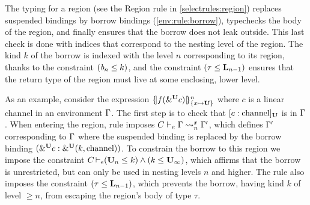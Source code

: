 The typing for a region (see the {\sc Region} rule in \cref{selectrules:region})
replaces suspended bindings by borrow bindings
(\cref{env:rule:borrow}), typechecks the body
of the region, and finally ensures that the borrow does not leak outside.
This last check is done with indices that correspond to the nesting
level of the region. The kind $k$ of the borrow is indexed with the level $n$
corresponding to its region, thanks to the constraint $(\BORROW_n\lk
k)$, and the constraint $\Cleq{\tau}{\klin_{n-1}}$ ensures that
the return type of the region must live at some enclosing, lower level.

As an example, consider the expression $\region{\Sone x\IBORROW}{f(\borrow[\IBORROW]{c})}$
where $c$ is a linear channel in an environment $\E$.
The first step is to check that $\svar[\IBORROW]{c}{\text{channel}}$
is in $\E$.
When entering the region, rule  imposes
$\lregion{C}{x}{\E}{\E'}$, which defines $\E'$
corresponding to $\E$ where the suspended binding is replaced by the
borrow binding  $\bvar{\borrow[\IBORROW]{c}}{\borrowty[\IBORROW]{k}{\text{channel}}}$.
To constrain the borrow to this region we impose the constraint
$\entail{C}{(\kun_n\lk k) \wedge (k \lk\kun_\infty)}$, which affirms
that the borrow is unrestricted, but can only be used in nesting
levels $n$ and higher.
%
%
The  rule also imposes the constraint
$\Cleq{\tau}{\klin_{n-1}}$, which prevents the borrow, having kind $k$ of level
$\geq n$, from escaping the region's body of type $\tau$.






